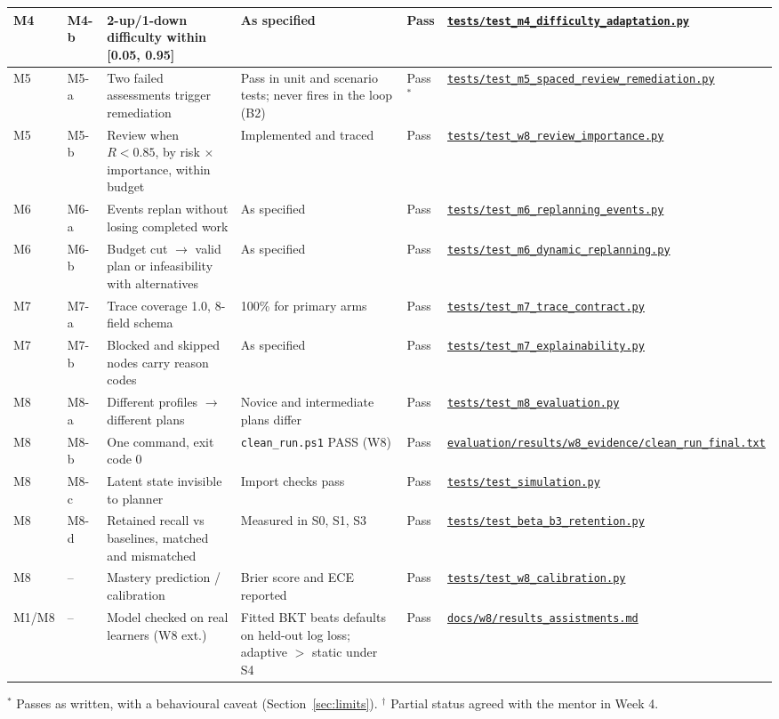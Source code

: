 \documentclass[english]{sintr}
\newcommand{\repourl}{https://github.com/Bhuvan-56/adaptive-learning-path-planner-DAT}
\newcommand{\sha}{cs5903-final-2026}
\DeclareRobustCommand{\rf}[1]{\href{\repourl/blob/\sha/#1}{\nolinkurl{#1}}}
\newcommand{\shax}{cs5903-final-2026}
\DeclareRobustCommand{\rfx}[1]{\href{\repourl/blob/\shax/#1}{\nolinkurl{#1}}}
\begin{document}
{\begin{longtable}{|C{1.12cm}|C{0.87cm}|L{3.65cm}|L{3.47cm}|C{1.13cm}|L{3.65cm}|}
M4 & M4-b & 2-up/1-down difficulty within [0.05, 0.95] & As specified & Pass & \rf{tests/test_m4_difficulty_adaptation.py} \\ \hline
M5 & M5-a & Two failed assessments trigger remediation & Pass in unit and scenario tests; never fires in the loop (B2) & Pass$^*$ & \rf{tests/test_m5_spaced_review_remediation.py} \\ \hline
M5 & M5-b & Review when $R<0.85$, by risk $\times$ importance, within budget & Implemented and traced & Pass & \rf{tests/test_w8_review_importance.py} \\ \hline
M6 & M6-a & Events replan without losing completed work & As specified & Pass & \rf{tests/test_m6_replanning_events.py} \\ \hline
M6 & M6-b & Budget cut $\rightarrow$ valid plan or infeasibility with alternatives & As specified & Pass & \rf{tests/test_m6_dynamic_replanning.py} \\ \hline
M7 & M7-a & Trace coverage 1.0, 8-field schema & 100\% for primary arms & Pass & \rf{tests/test_m7_trace_contract.py} \\ \hline
M7 & M7-b & Blocked and skipped nodes carry reason codes & As specified & Pass & \rf{tests/test_m7_explainability.py} \\ \hline
M8 & M8-a & Different profiles $\rightarrow$ different plans & Novice and intermediate plans differ & Pass & \rf{tests/test_m8_evaluation.py} \\ \hline
M8 & M8-b & One command, exit code 0 & \texttt{clean\_run.ps1} PASS (W8) & Pass & \rf{evaluation/results/w8_evidence/clean_run_final.txt} \\ \hline
M8 & M8-c & Latent state invisible to planner & Import checks pass & Pass & \rf{tests/test_simulation.py} \\ \hline
M8 & M8-d & Retained recall vs baselines, matched and mismatched & Measured in S0, S1, S3 & Pass & \rf{tests/test_beta_b3_retention.py} \\ \hline
M8 & -- & Mastery prediction / calibration & Brier score and ECE reported & Pass & \rf{tests/test_w8_calibration.py} \\ \hline
M1/M8 & -- & Model checked on real learners (W8 ext.) & Fitted BKT beats defaults on held-out log loss; adaptive $>$ static under S4 & Pass & \rfx{docs/w8/results_assistments.md} \\ \hline
\end{longtable}
}
{\footnotesize $^*$ Passes as written, with a behavioural caveat (Section~\ref{sec:limits}). $^\dagger$ Partial status agreed with the mentor in Week 4.}
\end{document}
